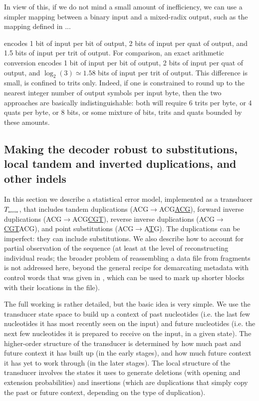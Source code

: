 \documentclass[english]{article}
\begin{document}
In view of this, if we do not mind a small amount of inefficiency,
we can use a simpler mapping between a binary input and a mixed-radix output,
such as the mapping defined in ...

encodes 1 bit of input per bit of output,
2 bits of input per quat of output,
and 1.5 bits of input per trit of output.
For comparison,
an exact arithmetic conversion
encodes 1 bit of input per bit of output,
2 bits of input per quat of output,
and $\log_2(3) \simeq 1.58$ bits of input per trit of output.
This difference is small, is confined to trits only.
Indeed, if one is constrained to round up to the nearest integer number of output symbols per input byte,
then the two approaches are basically indistinguishable:
both will require 6 trits per byte, or 4 quats per byte, or 8 bits,
or some mixture of bits, trits and quats bounded by these amounts.

\subsection{Making the decoder robust to substitutions, local tandem and inverted duplications, and other indels}

In this section we describe a statistical error model,
implemented as a transducer $T_{\mbox{\tiny error}}$,
that includes
tandem duplications (ACG$\to$ACG\underline{ACG}),
forward inverse duplications (ACG$\to$ACG\underline{CGT}),
reverse inverse duplications (ACG$\to$\underline{CGT}ACG),
and point substitutions (ACG$\to$A\underline{T}G).
The duplications can be imperfect: they can include substitutions.
We also describe how to account for partial observation of the sequence
(at least at the level of reconstructing individual reads;
the broader problem of reassembling a data file from fragments is not addressed here,
beyond the general recipe for demarcating metadata with control words
that was given in , which can be used to mark up shorter blocks
with their locations in the file).

The full working is rather detailed, but the basic idea is very simple.
We use the transducer state space to build up a context of past nucleotides
(i.e. the last few nucleotides it has most recently seen on the input)
and future nucleotides
(i.e. the next few nucleotides it is prepared to receive on the input, in a given state).
The higher-order structure of the transducer is determined by how much past and future context it has built up
(in the early stages),
and how much future context it has yet to work through
(in the later stages).
The local structure of the transducer involves the states it uses to generate
deletions (with opening and extension probabilities)
and insertions (which are duplications that simply copy the past or future context,
depending on the type of duplication).
\end{document}
